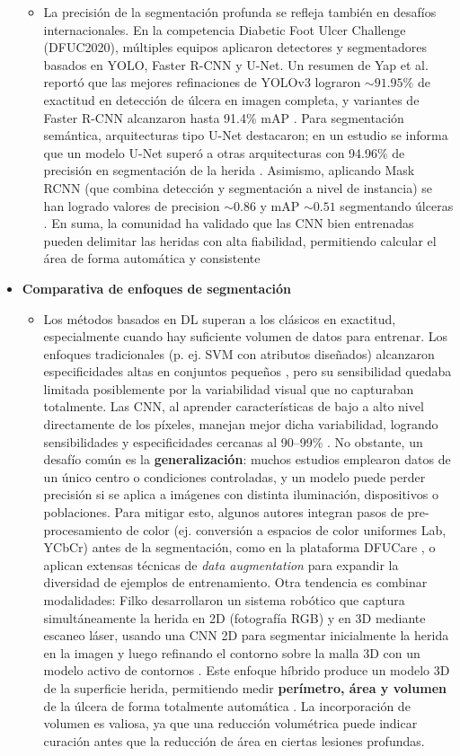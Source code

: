 \begin{itemize}
\begin{itemize}
        \item La precisión de la segmentación profunda se refleja también en desafíos internacionales. En la competencia Diabetic Foot Ulcer Challenge (DFUC2020), múltiples equipos aplicaron detectores y segmentadores basados en YOLO, Faster R-CNN y U-Net. Un resumen de Yap et al. reportó que las mejores refinaciones de YOLOv3 lograron $\sim 91.95\%$ de exactitud en detección de úlcera en imagen completa, y variantes de Faster R-CNN alcanzaron hasta 91.4\% mAP . Para segmentación semántica, arquitecturas tipo U-Net destacaron; en un estudio se informa que un modelo U-Net superó a otras arquitecturas con 94.96\% de precisión en segmentación de la herida . Asimismo, aplicando Mask RCNN (que combina detección y segmentación a nivel de instancia) se han logrado valores de precision $\sim 0.86$ y mAP $\sim 0.51$ segmentando úlceras . En suma, la comunidad ha validado que las CNN bien entrenadas pueden delimitar las heridas con alta fiabilidad, permitiendo calcular el área de forma automática y consistente
    \end{itemize}
    \item \textbf{Comparativa de enfoques de segmentación}
    \begin{itemize}
        \item Los métodos basados en DL superan a los clásicos en exactitud, especialmente cuando hay suficiente volumen de datos para entrenar. Los enfoques tradicionales (p. ej. SVM con atributos diseñados) alcanzaron especificidades altas en conjuntos pequeños , pero su sensibilidad quedaba limitada posiblemente por la variabilidad visual que no capturaban totalmente. Las CNN, al aprender características de bajo a alto nivel directamente de los píxeles, manejan mejor dicha variabilidad, logrando sensibilidades y especificidades cercanas al 90–99\% \cite{Chemello2022}. No obstante, un desafío común es la \textbf{generalización}: muchos estudios emplearon datos de un único centro o condiciones controladas, y un modelo puede perder precisión si se aplica a imágenes con distinta iluminación, dispositivos o poblaciones. Para mitigar esto, algunos autores integran pasos de pre-procesamiento de color (ej. conversión a espacios de color uniformes Lab, YCbCr) antes de la segmentación, como en la plataforma DFUCare \cite{Sendilraj2024}, o aplican extensas técnicas de \textit{data augmentation } \cite{Aldughayfiq2023} para expandir la diversidad de ejemplos de entrenamiento. Otra tendencia es combinar modalidades: Filko \cite{Filko2023} desarrollaron un sistema robótico que captura simultáneamente la herida en 2D (fotografía RGB) y en 3D mediante escaneo láser, usando una CNN 2D para segmentar inicialmente la herida en la imagen y luego refinando el contorno sobre la malla 3D con un modelo activo de contornos \cite{Filko2023}. Este enfoque híbrido produce un modelo 3D de la superficie herida, permitiendo medir \textbf{perímetro, área y volumen} de la úlcera de forma totalmente automática . La incorporación de volumen es valiosa, ya que una reducción volumétrica puede indicar curación antes que la reducción de área en ciertas lesiones profundas.
    \end{itemize}
\end{itemize}

